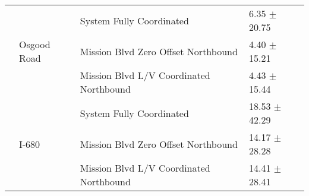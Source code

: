 \begin{tabular}{llll}
 & \multirow[t]{3}{*}{Osgood Road} & System Fully Coordinated & 6.35 $\pm$ 20.75 \\
 &  & Mission Blvd Zero Offset Northbound & 4.40 $\pm$ 15.21 \\
 &  & Mission Blvd L/V Coordinated Northbound & 4.43 $\pm$ 15.44 \\
 & \multirow[t]{3}{*}{I-680} & System Fully Coordinated & 18.53 $\pm$ 42.29 \\
 &  & Mission Blvd Zero Offset Northbound & 14.17 $\pm$ 28.28 \\
 &  & Mission Blvd L/V Coordinated Northbound & 14.41 $\pm$ 28.41 \\
\bottomrule
\end{tabular}
